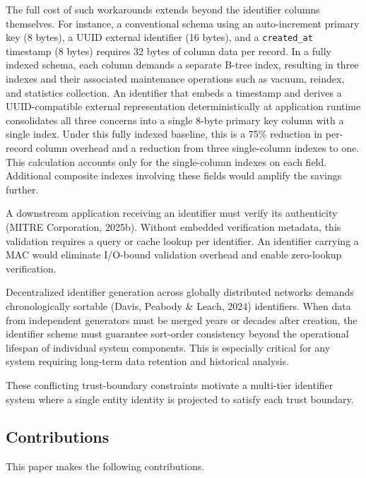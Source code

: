 \documentclass[fleqn,10pt,lineno]{wlpeerj}
\begin{document}
The full cost of such workarounds extends beyond the identifier columns
themselves. For instance, a conventional schema using an auto-increment
primary key (8 bytes), a UUID external identifier (16 bytes), and a
\texttt{created\_at} timestamp (8 bytes) requires 32 bytes of column
data per record. In a fully indexed schema, each column demands a
separate B-tree index, resulting in three indexes and their associated
maintenance operations such as vacuum, reindex, and statistics
collection. An identifier that embeds a timestamp and derives a
UUID-compatible external representation deterministically at application
runtime consolidates all three concerns into a single 8-byte primary key
column with a single index. Under this fully indexed baseline, this is a
75\% reduction in per-record column overhead and a reduction from three
single-column indexes to one. This calculation accounts only for the
single-column indexes on each field. Additional composite indexes
involving these fields would amplify the savings further.

A downstream application receiving an identifier must verify its
authenticity (MITRE Corporation, 2025b). Without embedded verification
metadata, this validation requires a query or cache lookup per
identifier. An identifier carrying a MAC would eliminate I/O-bound
validation overhead and enable zero-lookup verification.

Decentralized identifier generation across globally distributed networks
demands chronologically sortable (Davis, Peabody \& Leach, 2024)
identifiers. When data from independent generators must be merged years
or decades after creation, the identifier scheme must guarantee
sort-order consistency beyond the operational lifespan of individual
system components. This is especially critical for any system requiring
long-term data retention and historical analysis.

These conflicting trust-boundary constraints motivate a multi-tier
identifier system where a single entity identity is projected to satisfy
each trust boundary.

\subsection{Contributions}\label{contributions}

This paper makes the following contributions.
\end{document}

